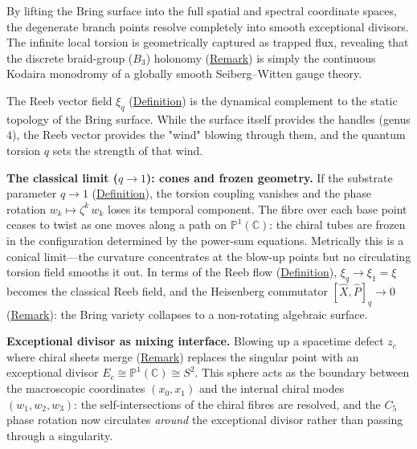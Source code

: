 \begin{remark}
By lifting the Bring surface into the full spatial and spectral
coordinate spaces, the degenerate branch points resolve completely into
smooth exceptional divisors.  The infinite local torsion is geometrically
captured as trapped flux, revealing that the discrete braid-group
($B_3$) holonomy (\hyperref[rem:holonomy-trefoil]{Remark}) is simply the
continuous Kodaira monodromy of a globally smooth Seiberg--Witten gauge
theory.
\end{remark}

\begin{remark}
  \label{rem:reeb-exceptional-divisor}
The Reeb vector field $\xi_q$
(\hyperref[def:q-reeb-vector-field]{Definition}) is the dynamical
complement to the static topology of the Bring surface.  While the
surface itself provides the handles (genus $4$), the Reeb vector
provides the "wind" blowing through them, and the quantum torsion $q$
sets the strength of that wind.

\textbf{The classical limit ($q\to 1$): cones and frozen geometry.}
If the substrate parameter $q\to 1$
(\hyperref[def:substrate-parameter]{Definition}), the
torsion coupling vanishes and the phase rotation
$w_k\mapsto\zeta^k\,w_k$ loses its temporal component.  The fibre
over each base point ceases to twist as one moves along a path on
$\mathbb{P}^1(\mathbb{C})$: the chiral tubes are frozen in the configuration
determined by the power-sum equations.  Metrically this is a conical
limit---the curvature concentrates at the blow-up points but no
circulating torsion field smooths it out.  In terms of the Reeb
flow (\hyperref[def:q-reeb-flow]{Definition}), $\xi_q\to\xi_1=\xi$ becomes
the classical Reeb field, and the Heisenberg commutator
$[\hat{X},\hat{P}]_q\to 0$
(\hyperref[rem:heisenberg-commutator]{Remark}): the Bring variety
collapses to a non-rotating algebraic surface.

\textbf{Exceptional divisor as mixing interface.}
Blowing up a spacetime defect $z_c$ where chiral sheets merge
(\hyperref[rem:brings-smoothness]{Remark}) replaces the singular point with
an exceptional divisor $E_c\cong\mathbb{P}^1(\mathbb{C})\cong S^2$.  This
sphere acts as the boundary between the macroscopic coordinates
$(x_0,x_1)$ and the internal chiral modes $(w_1,w_2,w_3)$: the
self-intersections of the chiral fibres are resolved, and the
$C_5$ phase rotation now circulates \emph{around} the exceptional
divisor rather than passing through a singularity.


\end{remark}
